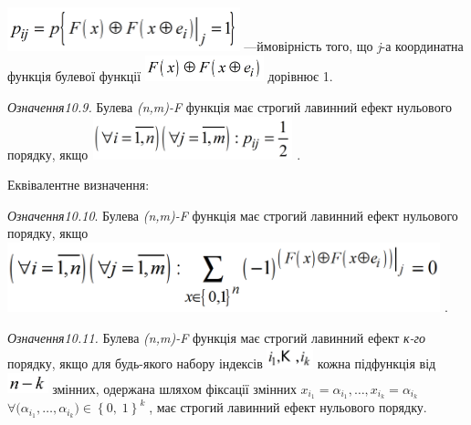  \includegraphics[width=2.6528in,height=0.498in]{crypt-img/crypt-img229.png}
\textit{ }---ймовірність того, що \textit{j}{}-а координатна функція булевої
функції 
\includegraphics[width=1.3555in,height=0.3028in]{crypt-img/crypt-img230.png} 
дорівнює  1.

\textit{ Означення10.9.} Булева 
\textit{(}\textit{n}\textit{,}\textit{m}\textit{)-}\textit{F}  функція має
строгий лавинний ефект нульового порядку, якщо 
\includegraphics[width=2.2874in,height=0.4882in]{crypt-img/crypt-img231.png} .

Еквівалентне визначення:

 \textit{Означення10.10}. Булева
\textit{(}\textit{n}\textit{,}\textit{m}\textit{)-}\textit{F} функція має
строгий лавинний ефект нульового порядку, якщо 
\includegraphics[width=4.9409in,height=0.7929in]{crypt-img/crypt-img232.png} .

\textit{ Означення10.11.} Булева
\textit{(}\textit{n}\textit{,}\textit{m}\textit{)-}\textit{F}  функція має
строгий лавинний ефект \textit{к-го }порядку, якщо для будь-якого набору
індексів 
\includegraphics[width=0.528in,height=0.25in]{crypt-img/crypt-img233.png} 
кожна підфункція від 
\includegraphics[width=0.4638in,height=0.2374in]{crypt-img/crypt-img234.png} 
змінних, одержана шляхом фіксації змінних  ${x_{{i_{{1}}}}=\alpha
_{i_{{1}}}{,\dots,x_{i_{{k}}}}{=\alpha _{i_{{k}}}}}$ 
${\forall (\alpha _{{i_{{1}}}},\dots,\alpha _{i_{{k}}}{)\in
\left\{0,\;1\right\}^{k}}{\;}}$, має строгий лавинний ефект нульового порядку. 

